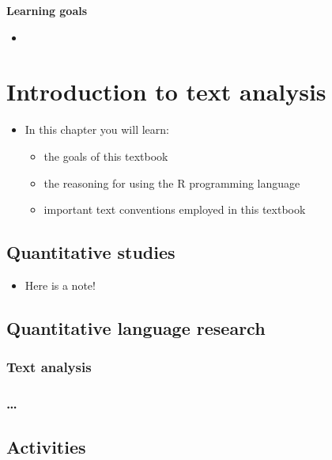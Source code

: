\documentclass[
]{article}
\providecommand{\tightlist}{%
  \setlength{\itemsep}{0pt}\setlength{\parskip}{0pt}}
\newenvironment{rmdblock}[1]
  {\begin{shaded*}
  \begin{itemize}
  \renewcommand{\labelitemi}{
    \raisebox{-.5\height}[0pt][0pt]{
      {\setkeys{Gin}{width=2em,keepaspectratio}\texttt{[image: assets/images/\#1]}}
    }
  }
  \item
  }
  {
  \end{itemize}
  \end{shaded*}
  }
\newenvironment{rmdkey}
  {\begin{rmdblock}{key}}
  {\end{rmdblock}}
\newenvironment{rmdnote}
  {\begin{rmdblock}{note}}
  {\end{rmdblock}}
\begin{document}
\textbf{Learning goals}

\begin{itemize}
\tightlist
\item
\end{itemize}

\hypertarget{introduction-to-text-analysis}{%
\section{Introduction to text analysis}\label{introduction-to-text-analysis}}

\begin{rmdkey}
In this chapter you will learn:

\begin{itemize}
\tightlist
\item
  the goals of this textbook
\item
  the reasoning for using the R programming language
\item
  important text conventions employed in this textbook
\end{itemize}
\end{rmdkey}

\hypertarget{quantitative-studies}{%
\subsection{Quantitative studies}\label{quantitative-studies}}

\begin{rmdnote}
Here is a note!
\end{rmdnote}

\hypertarget{quantitative-language-research}{%
\subsection{Quantitative language research}\label{quantitative-language-research}}

\hypertarget{text-analysis}{%
\subsubsection{Text analysis}\label{text-analysis}}

\hypertarget{section}{%
\subsubsection{\ldots{}}\label{section}}

\hypertarget{activities}{%
\subsection*{Activities}\label{activities}}
\end{document}
